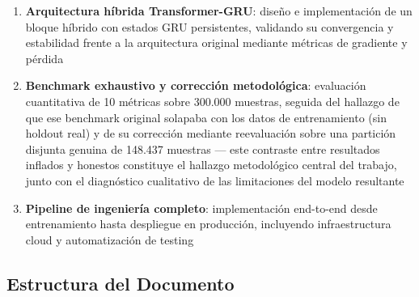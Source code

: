 \begin{enumerate}
    \item \textbf{Arquitectura híbrida Transformer-GRU}: diseño e implementación de un bloque híbrido con estados GRU persistentes, validando su convergencia y estabilidad frente a la arquitectura original mediante métricas de gradiente y pérdida
    \item \textbf{Benchmark exhaustivo y corrección metodológica}: evaluación cuantitativa de 10 métricas sobre 300.000 muestras, seguida del hallazgo de que ese benchmark original solapaba con los datos de entrenamiento (sin holdout real) y de su corrección mediante reevaluación sobre una partición disjunta genuina de 148.437 muestras --- este contraste entre resultados inflados y honestos constituye el hallazgo metodológico central del trabajo, junto con el diagnóstico cualitativo de las limitaciones del modelo resultante
    \item \textbf{Pipeline de ingeniería completo}: implementación end-to-end desde entrenamiento hasta despliegue en producción, incluyendo infraestructura cloud y automatización de testing
\end{enumerate}

\subsection{Estructura del Documento}

